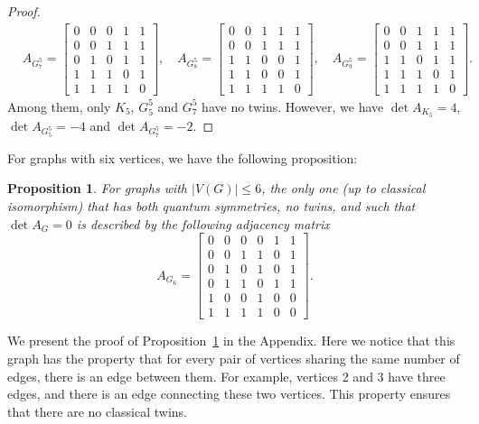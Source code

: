 \documentclass[11pt,reqno]{amsart}
\newtheorem{proposition}{Proposition}[section]
\begin{document}
\begin{proof}
\begin{align*}
&A_{\scriptscriptstyle G^5_7}=\begin{bmatrix}
0&0&0&1&1\\
0&0&1&1&1\\
0&1&0&1&1\\
1&1&1&0&1\\
1&1&1&1&0
\end{bmatrix},\quad
A_{\scriptscriptstyle G^5_8}=\begin{bmatrix}
0&0&1&1&1\\
0&0&1&1&1\\
1&1&0&0&1\\
1&1&0&0&1\\
1&1&1&1&0
\end{bmatrix},\quad
A_{\scriptscriptstyle G^5_9}=\begin{bmatrix}
0&0&1&1&1\\
0&0&1&1&1\\
1&1&0&1&1\\
1&1&1&0&1\\
1&1&1&1&0
\end{bmatrix}.
\end{align*}
Among them, only $K_5$, $G_5^5$ and $G_7^5$ have no twins. However, we have $\det A_{\scriptscriptstyle K_5}=4$, $\det A_{\scriptscriptstyle G_5^5}=-4$ and $\det A_{\scriptscriptstyle G_7^5}=-2$.
\end{proof}

For graphs with six vertices, we have the following proposition:

\begin{proposition}\label{prop:twin6}
For graphs with $|V(G)|\leq 6$, the only one (up to classical isomorphism) that has both quantum symmetries, no twins, and such that $\det A_{\scriptscriptstyle G}=0$ is described by the following adjacency matrix
\[
A_{\scriptscriptstyle G_6}=\begin{bmatrix}
0&0&0&0&1&1\\
0&0&1&1&0&1\\
0&1&0&1&0&1\\
0&1&1&0&1&1\\
1&0&0&1&0&0\\
1&1&1&1&0&0
\end{bmatrix}.
\]
\end{proposition}

We present the proof of Proposition~\ref{prop:twin6} in the Appendix. Here we notice that this graph has the property that for every pair of vertices sharing the same number of edges, there is an edge between them. For example, vertices 2 and 3 have three edges, and there is an edge connecting these two vertices. This property ensures that there are no classical twins.
\end{document}
